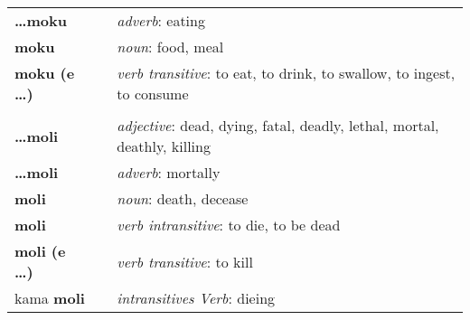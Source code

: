 \begin{supertabular}{p{2,5cm}|ll}
\textbf{\dots moku} && \textit{adverb}: eating \\ 
\textbf{moku} && \textit{noun}: food, meal \\ 
\textbf{moku (e \dots)} && \textit{verb transitive}: to eat, to drink, to swallow, to ingest, to consume \\ 
 && \\ %
\textbf{\dots moli} && \textit{adjective}: dead, dying, fatal, deadly, lethal, mortal, deathly, killing \\ 
\textbf{\dots moli} && \textit{adverb}: mortally \\ 
\textbf{moli} && \textit{noun}: death, decease \\ 
\textbf{moli} && \textit{verb intransitive}: to die, to be dead \\ 
\textbf{moli (e \dots)} && \textit{verb transitive}: to kill \\ 
kama \textbf{moli} && \textit{intransitives Verb}: dieing \\ 


\end{supertabular}
